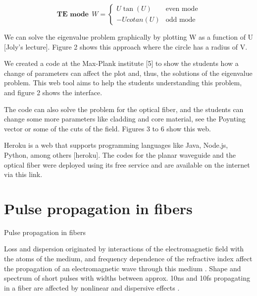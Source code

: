             
            \begin{equation}
            \textbf{TE mode} \ \ W=
                \begin{cases}
                    U \tan(U) & \text{even mode}\\
                    -U cotan(U) & \text{odd mode}
                \end{cases}
                \label{Temode}
            \end{equation}

We can solve the eigenvalue problem graphically by plotting W as a function of U [Joly's lecture]. Figure 2 shows this approach where the circle has a radius of V.

We created a code at the Max-Plank institute [5] to show the students how a change of parameters can affect the plot and, thus, the solutions of the eigenvalue problem. This web tool aims to help the students understanding this problem, and figure 2 shows the interface. 



The code can also solve the problem for the optical fiber, and the students can change some more parameters like cladding and core material, see the Poynting vector or some of the cuts of the field. Figures 3 to 6 show this web. 


Heroku is a web that supports programming languages like Java, Node.js, Python, among others [heroku]. The codes for the planar waveguide and the optical fiber were deployed using its free service and are available on the internet via this link.


   


\section{Pulse propagation in fibers}

Pulse propagation in fibers

Loss and dispersion originated by interactions of the electromagnetic field with the atoms of the medium, and frequency dependence of the refractive index affect the propagation of an electromagnetic wave through this medium \citep{dudley_taylor_2010}. Shape and spectrum of short pulses with widths between approx. 10ns and 10fs propagating in a fiber are affected by nonlinear and dispersive effects \citep{AgrawalBook}.  

